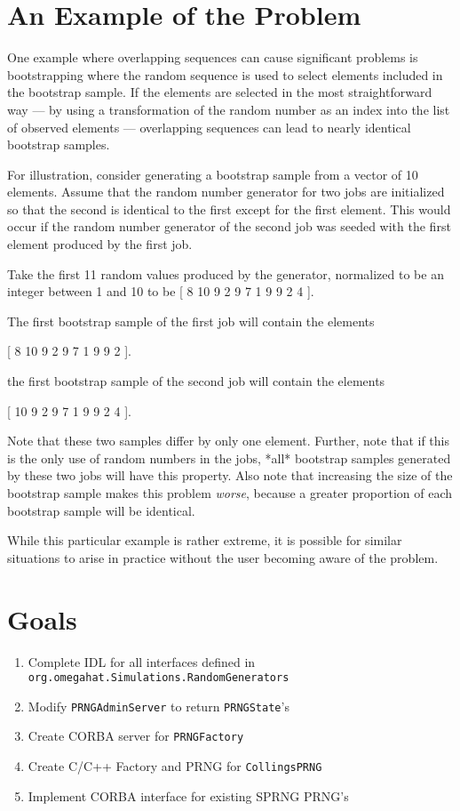 \documentclass{article}
\begin{document}
\section{An Example of the Problem}

One example where overlapping sequences can cause significant problems
is bootstrapping where the random sequence is used to select elements
included in the bootstrap sample.  If the elements are
selected in the most straightforward way --- by using a transformation of
the random number as an index into the list of observed elements ---
overlapping sequences can lead to nearly identical bootstrap samples.

For illustration, consider generating a bootstrap sample from a vector
of 10 elements.  Assume that the random number generator for two jobs
are initialized so that the second is identical to the first except for the
first element.   This would occur if the random number generator of
the second job was seeded with the first element produced by the first
job.  

Take the first 11 random values produced by the generator, normalized
to be an integer between  1 and 10 to be
[ 8 10  9  2  9  7  1  9  9  2  4 ].  

The first bootstrap sample of the first job will contain  the elements

  [ 8 10  9  2  9  7  1  9  9  2 ].

the first bootstrap sample of the second job will contain the elements

  [ 10  9  2  9  7  1  9  9  2  4 ].

Note that these two samples differ by only one element.  Further, note
that if this is the only use of random numbers in the jobs, *all*
bootstrap samples generated by these two jobs will have this
property.  Also note that increasing the size of the bootstrap sample
makes this problem \emph{worse}, because a greater proportion of
each bootstrap sample will be identical.

While this particular example is rather extreme, it is possible for
similar situations to arise in practice without the user becoming
aware of the problem.

\section{Goals}

\begin{enumerate}
  \item Complete IDL for all interfaces defined in
	\verb+org.omegahat.Simulations.RandomGenerators+
  \item Modify \verb+PRNGAdminServer+ to return \verb+PRNGState+'s 
  \item Create CORBA server for \verb+PRNGFactory+
  \item Create C/C++ Factory and PRNG for \verb+CollingsPRNG+
  \item Implement CORBA interface for existing SPRNG PRNG's
\end{enumerate}
\end{document}

